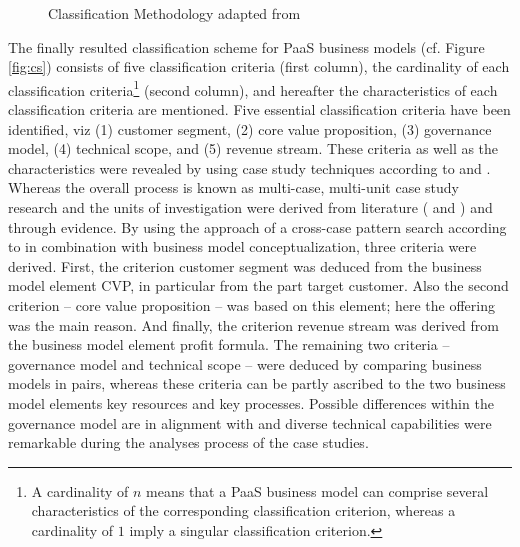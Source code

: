 \begin{figure}[t]
	\centering
	
	\caption[Classification Methodology]{Classification Methodology adapted from \citet[p. 44]{Fettke2003}}
	\label{fig:cm}
\end{figure}

The finally resulted classification scheme for \ac{PaaS} business models (cf. Figure \ref{fig:cs}) consists of five classification criteria (first column), the cardinality of each classification criteria\footnote{A cardinality of $n$ means that a \ac{PaaS} business model can comprise several characteristics of the corresponding classification criterion, whereas a cardinality of $1$ imply a singular classification criterion.} (second column), and hereafter the characteristics of each classification criteria are mentioned. Five essential classification criteria have been identified, viz (1) customer segment, (2) core value proposition, (3) governance model, (4) technical scope, and (5) revenue stream. These criteria as well as the characteristics were revealed by using case study techniques according to \citet{Eisenhardt1989} and \citet{Yin2008}. Whereas the overall process is known as multi-case, multi-unit case study research \citep{Yin2008} and the units of investigation were derived from literature (\citealp{Johnson2008} and \citealp{Tiwana2010}) and through evidence. By using the approach of a cross-case pattern search according to \citet{Eisenhardt1989} in combination with \citet{Johnson2008} business model conceptualization, three criteria were derived. First, the criterion customer segment was deduced from the business model element \ac{CVP}, in particular from the part target customer. Also the second criterion -- core value proposition -- was based on this element; here the offering was the main reason. And finally, the criterion revenue stream was derived from the business model element profit formula. The remaining two criteria -- governance model and technical scope -- were deduced by comparing business models in pairs, whereas these criteria can be partly ascribed to the two business model elements key resources and key processes. Possible differences within the governance model are in alignment with \citet{Tiwana2010} and diverse technical capabilities were remarkable during the analyses process of the case studies.

